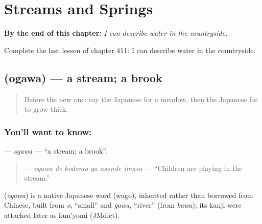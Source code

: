 
\chapter{Streams and Springs}
\label{ch:ja-streams-and-springs}

\begin{chapteropening}
\textbf{By the end of this chapter:} \emph{I can describe water in the countryside.}

Complete the last lesson of chapter 411: I can describe water in the countryside.
\end{chapteropening}

\section[\texorpdfstring{\ja{おがわ} (ogawa)}{おがわ (ogawa)}]{ (ogawa) — a stream; a brook}

\label{lesson:JA-C411-ogawa}



\begin{quote}
Before the new one: say the Japanese for a meadow, then the Japanese for to grow thick.
\end{quote}

\subsection*{You'll want to know: }
\textbf{} — \emph{ogawa} — \textquotedblleft{}a stream; a brook\textquotedblright{}.

\begin{quote}
\textbf{  } — \emph{ogawa de kodomo ga asonde imasu} — \textquotedblleft{}Children are playing in the stream.\textquotedblright{}
\end{quote}

\begin{cousinweb}
\textbf{} (\emph{ogawa}) is a native Japanese word (wago), inherited rather than borrowed from Chinese, built from \emph{o}, \textquotedblleft{}small\textquotedblright{} and \emph{gawa}, \textquotedblleft{}river\textquotedblright{} (from \emph{kawa}); its kanji were attached later as kun'yomi (JMdict).
\end{cousinweb}

